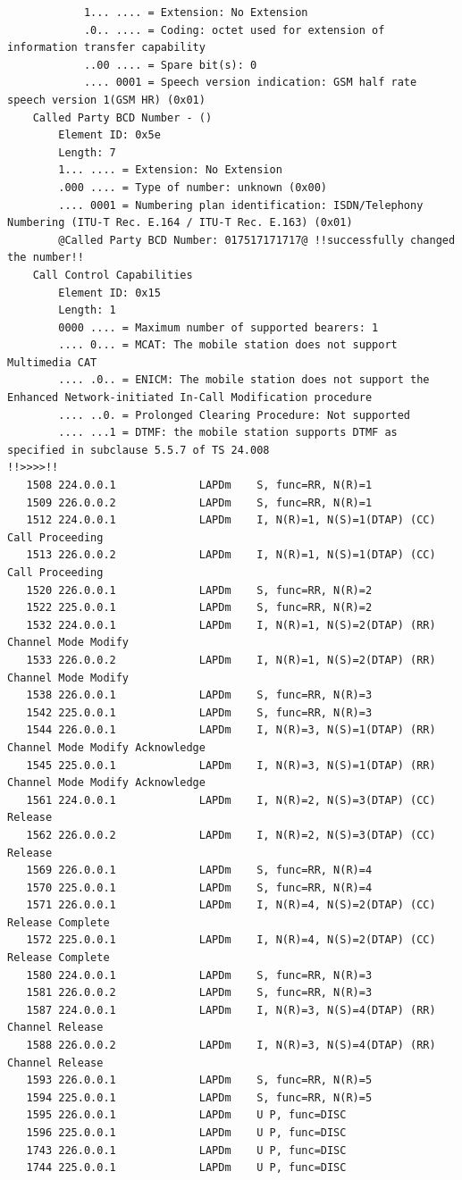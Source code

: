 \begin{lstlisting}
            1... .... = Extension: No Extension
            .0.. .... = Coding: octet used for extension of information transfer capability
            ..00 .... = Spare bit(s): 0
            .... 0001 = Speech version indication: GSM half rate speech version 1(GSM HR) (0x01)
    Called Party BCD Number - ()
        Element ID: 0x5e
        Length: 7
        1... .... = Extension: No Extension
        .000 .... = Type of number: unknown (0x00)
        .... 0001 = Numbering plan identification: ISDN/Telephony Numbering (ITU-T Rec. E.164 / ITU-T Rec. E.163) (0x01)
        @Called Party BCD Number: 017517171717@ !!successfully changed the number!!
    Call Control Capabilities
        Element ID: 0x15
        Length: 1
        0000 .... = Maximum number of supported bearers: 1
        .... 0... = MCAT: The mobile station does not support Multimedia CAT
        .... .0.. = ENICM: The mobile station does not support the Enhanced Network-initiated In-Call Modification procedure
        .... ..0. = Prolonged Clearing Procedure: Not supported
        .... ...1 = DTMF: the mobile station supports DTMF as specified in subclause 5.5.7 of TS 24.008
!!>>>>!!
   1508 224.0.0.1             LAPDm    S, func=RR, N(R)=1
   1509 226.0.0.2             LAPDm    S, func=RR, N(R)=1
   1512 224.0.0.1             LAPDm    I, N(R)=1, N(S)=1(DTAP) (CC) Call Proceeding 
   1513 226.0.0.2             LAPDm    I, N(R)=1, N(S)=1(DTAP) (CC) Call Proceeding 
   1520 226.0.0.1             LAPDm    S, func=RR, N(R)=2
   1522 225.0.0.1             LAPDm    S, func=RR, N(R)=2
   1532 224.0.0.1             LAPDm    I, N(R)=1, N(S)=2(DTAP) (RR) Channel Mode Modify 
   1533 226.0.0.2             LAPDm    I, N(R)=1, N(S)=2(DTAP) (RR) Channel Mode Modify 
   1538 226.0.0.1             LAPDm    S, func=RR, N(R)=3
   1542 225.0.0.1             LAPDm    S, func=RR, N(R)=3
   1544 226.0.0.1             LAPDm    I, N(R)=3, N(S)=1(DTAP) (RR) Channel Mode Modify Acknowledge 
   1545 225.0.0.1             LAPDm    I, N(R)=3, N(S)=1(DTAP) (RR) Channel Mode Modify Acknowledge 
   1561 224.0.0.1             LAPDm    I, N(R)=2, N(S)=3(DTAP) (CC) Release 
   1562 226.0.0.2             LAPDm    I, N(R)=2, N(S)=3(DTAP) (CC) Release 
   1569 226.0.0.1             LAPDm    S, func=RR, N(R)=4
   1570 225.0.0.1             LAPDm    S, func=RR, N(R)=4
   1571 226.0.0.1             LAPDm    I, N(R)=4, N(S)=2(DTAP) (CC) Release Complete 
   1572 225.0.0.1             LAPDm    I, N(R)=4, N(S)=2(DTAP) (CC) Release Complete 
   1580 224.0.0.1             LAPDm    S, func=RR, N(R)=3
   1581 226.0.0.2             LAPDm    S, func=RR, N(R)=3
   1587 224.0.0.1             LAPDm    I, N(R)=3, N(S)=4(DTAP) (RR) Channel Release 
   1588 226.0.0.2             LAPDm    I, N(R)=3, N(S)=4(DTAP) (RR) Channel Release 
   1593 226.0.0.1             LAPDm    S, func=RR, N(R)=5
   1594 225.0.0.1             LAPDm    S, func=RR, N(R)=5
   1595 226.0.0.1             LAPDm    U P, func=DISC
   1596 225.0.0.1             LAPDm    U P, func=DISC
   1743 226.0.0.1             LAPDm    U P, func=DISC
   1744 225.0.0.1             LAPDm    U P, func=DISC
\end{lstlisting}

